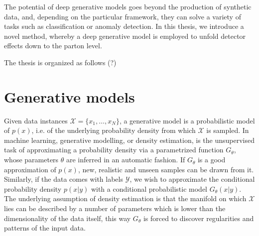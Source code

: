 The potential of deep generative models goes beyond the production of synthetic data, and, depending on the particular framework, they can solve a variety of tasks such as classification or anomaly detection. In this thesis, we introduce a novel method, whereby a deep generative model is employed to unfold detector effects down to the parton level.

The thesis is organized as follows (?)

\section{Generative models}\label{sec:gmm}
Given data instances $\mathcal{X} = \{ x_1, \ldots , x_N \}$, a generative model is a probabilistic model of $p(x)$, i.e. of the underlying probability density from which $\mathcal{X}$ is sampled. 
In machine learning, generative modelling, or density estimation, is the unsupervised task of approximating a probability density via a parametrized function $G_{\theta}$, whose parameters $\theta$ are inferred in an automatic fashion. If $G_{\theta}$ is a good approximation of $p(x)$, new, realistic and unseen samples can be drawn from it.
Similarly, if the data comes with labels $\mathcal{Y}$, we wish to approximate the conditional probability density $p(x | y)$ with a conditional probabilistic model $G_{\theta}(x | y)$.
The underlying assumption of density estimation is that the manifold on which $\mathcal{X}$ lies can be described by a number of parameters which is lower than the dimensionality of the data itself, this way $G_{\theta}$ 
is forced to discover regularities and patterns of the input data.

